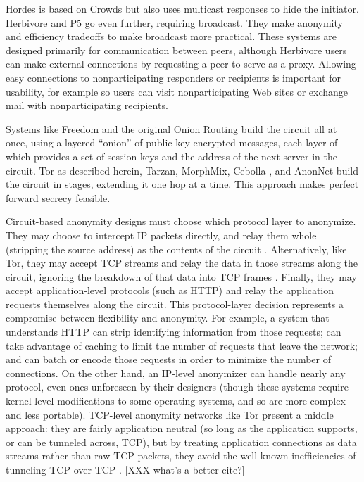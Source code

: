 \documentclass[times,10pt,twocolumn]{article}
\begin{document}
Hordes \cite{hordes-jcs} is based on Crowds but also uses multicast
responses to hide the initiator. Herbivore \cite{herbivore} and P5
\cite{p5} go even further, requiring broadcast. They make anonymity
and efficiency tradeoffs to make broadcast more practical.
These systems are designed primarily for communication between peers,
although Herbivore users can make external connections by
requesting a peer to serve as a proxy.  Allowing easy connections to
nonparticipating responders or recipients is important for usability,
for example so users can visit nonparticipating Web sites or exchange
mail with nonparticipating recipients.

Systems like Freedom and the original Onion Routing build the circuit
all at once, using a layered ``onion'' of public-key encrypted messages,
each layer of which provides a set of session keys and the address of the
next server in the circuit. Tor as described herein, Tarzan, MorphMix,
Cebolla \cite{cebolla}, and AnonNet \cite{anonnet} build the circuit
in stages, extending it one hop at a time. This approach makes perfect
forward secrecy feasible.

Circuit-based anonymity designs must choose which protocol layer
to anonymize. They may choose to intercept IP packets directly, and
relay them whole (stripping the source address) as the contents of
the circuit \cite{freedom2-arch,tarzan:ccs02}.  Alternatively, like
Tor, they may accept TCP streams and relay the data in those streams
along the circuit, ignoring the breakdown of that data into TCP frames
\cite{morphmix:fc04,anonnet}. Finally, they may accept application-level
protocols (such as HTTP) and relay the application requests themselves
along the circuit.  
This protocol-layer decision represents a compromise between flexibility
and anonymity.  For example, a system that understands HTTP can strip
identifying information from those requests; can take advantage of caching
to limit the number of requests that leave the network; and can batch
or encode those requests in order to minimize the number of connections.
On the other hand, an IP-level anonymizer can handle nearly any protocol,
even ones unforeseen by their designers (though these systems require
kernel-level modifications to some operating systems, and so are more
complex and less portable). TCP-level anonymity networks like Tor present
a middle approach: they are fairly application neutral (so long as the
application supports, or can be tunneled across, TCP), but by treating
application connections as data streams rather than raw TCP packets,
they avoid the well-known inefficiencies of tunneling TCP over TCP
\cite{tcp-over-tcp-is-bad}. [XXX what's a better cite?]
\end{document}
